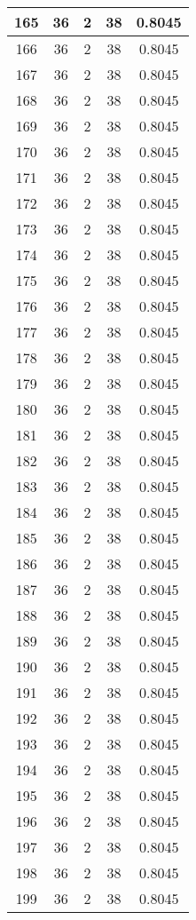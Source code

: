 \documentclass[letterpaper, 12pt]{article}
\begin{document}
\begin{longtable}{|c|c|c|c|c|}
\hline
165 & 36 & 2 & 38 & 0.8045 \\
\hline
166 & 36 & 2 & 38 & 0.8045 \\
\hline
167 & 36 & 2 & 38 & 0.8045 \\
\hline
168 & 36 & 2 & 38 & 0.8045 \\
\hline
169 & 36 & 2 & 38 & 0.8045 \\
\hline
170 & 36 & 2 & 38 & 0.8045 \\
\hline
171 & 36 & 2 & 38 & 0.8045 \\
\hline
172 & 36 & 2 & 38 & 0.8045 \\
\hline
173 & 36 & 2 & 38 & 0.8045 \\
\hline
174 & 36 & 2 & 38 & 0.8045 \\
\hline
175 & 36 & 2 & 38 & 0.8045 \\
\hline
176 & 36 & 2 & 38 & 0.8045 \\
\hline
177 & 36 & 2 & 38 & 0.8045 \\
\hline
178 & 36 & 2 & 38 & 0.8045 \\
\hline
179 & 36 & 2 & 38 & 0.8045 \\
\hline
180 & 36 & 2 & 38 & 0.8045 \\
\hline
181 & 36 & 2 & 38 & 0.8045 \\
\hline
182 & 36 & 2 & 38 & 0.8045 \\
\hline
183 & 36 & 2 & 38 & 0.8045 \\
\hline
184 & 36 & 2 & 38 & 0.8045 \\
\hline
185 & 36 & 2 & 38 & 0.8045 \\
\hline
186 & 36 & 2 & 38 & 0.8045 \\
\hline
187 & 36 & 2 & 38 & 0.8045 \\
\hline
188 & 36 & 2 & 38 & 0.8045 \\
\hline
189 & 36 & 2 & 38 & 0.8045 \\
\hline
190 & 36 & 2 & 38 & 0.8045 \\
\hline
191 & 36 & 2 & 38 & 0.8045 \\
\hline
192 & 36 & 2 & 38 & 0.8045 \\
\hline
193 & 36 & 2 & 38 & 0.8045 \\
\hline
194 & 36 & 2 & 38 & 0.8045 \\
\hline
195 & 36 & 2 & 38 & 0.8045 \\
\hline
196 & 36 & 2 & 38 & 0.8045 \\
\hline
197 & 36 & 2 & 38 & 0.8045 \\
\hline
198 & 36 & 2 & 38 & 0.8045 \\
\hline
199 & 36 & 2 & 38 & 0.8045 \\
\hline
\end{longtable}
\end{document}
